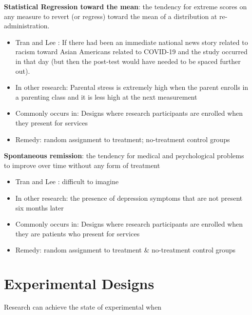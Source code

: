 \documentclass[
  english,
]{book}
\providecommand{\tightlist}{%
  \setlength{\itemsep}{0pt}\setlength{\parskip}{0pt}}
\begin{document}
\textbf{Statistical Regression toward the mean}: the tendency for extreme scores on any measure to revert (or regress) toward the mean of a distribution at re-administration.

\begin{itemize}
\tightlist
\item
  Tran and Lee \citeyearpar{tran_you_2014}: If there had been an immediate national news story related to racism toward Asian Americans related to COVID-19 and the study occurred in that day (but then the post-test would have needed to be spaced further out).
\item
  In other research: Parental stress is extremely high when the parent enrolls in a parenting class and it is less high at the next measurement
\item
  Commonly occurs in: Designs where research participants are enrolled when they present for services
\item
  Remedy: random assignment to treatment; no-treatment control groups
\end{itemize}

\textbf{Spontaneous remission}: the tendency for medical and psychological problems to improve over time without any form of treatment

\begin{itemize}
\tightlist
\item
  Tran and Lee \citeyearpar{tran_you_2014}: difficult to imagine
\item
  In other research: the presence of depression symptoms that are not present six months later
\item
  Commonly occurs in: Designs where research participants are enrolled when they are patients who present for services
\item
  Remedy: random assignment to treatment \& no-treatment control groups
\end{itemize}

\hypertarget{experimental-designs}{%
\section{Experimental Designs}\label{experimental-designs}}

Research can achieve the state of experimental when
\end{document}
